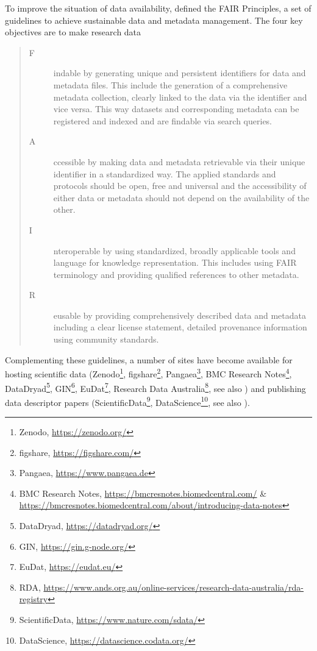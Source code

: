 To improve the situation of data availability, \citet{Wilkinson_2016} defined the FAIR Principles, a set of guidelines to achieve sustainable data and metadata management. The four key objectives are to make research data
\begin{quote}
\begin{description}
 \item[F]indable by generating unique and persistent identifiers for data and metadata files. This include the generation of a comprehensive metadata collection, clearly linked to the data via the identifier and vice versa. This way datasets and corresponding metadata can be registered and indexed and are findable via search queries.
 \item[A]ccessible by making data and metadata retrievable via their unique identifier in a standardized way. The applied standards and protocols should be open, free and universal and the accessibility of either data or metadata should not depend on the availability of the other. 
 \item[I]nteroperable by using standardized, broadly applicable tools and language for knowledge representation. This includes using FAIR terminology and providing qualified references to other metadata.
 \item[R]eusable by providing comprehensively described data and metadata including a clear license statement, detailed provenance information using community standards. 
\end{description}
\end{quote}
 Complementing these guidelines, a number of sites have become available for hosting scientific data (Zenodo\footnote{Zenodo, \url{https://zenodo.org/}}, figshare\footnote{figshare, \url{https://figshare.com/}}, Pangaea\footnote{Pangaea, \url{https://www.pangaea.de}}, BMC Research Notes\footnote{BMC Research Notes, \url{https://bmcresnotes.biomedcentral.com/} \& \url{https://bmcresnotes.biomedcentral.com/about/introducing-data-notes}}, DataDryad\footnote{DataDryad, \url{https://datadryad.org/}}, GIN\footnote{GIN, \url{https://gin.g-node.org/}}, EuDat\footnote{EuDat, \url{https://eudat.eu/}}, Research Data Australia\footnote{RDA, \url{https://www.ands.org.au/online-services/research-data-australia/rda-registry}}, see also \citet{Assante_2016}) and publishing data descriptor papers (ScientificData\footnote{ScientificData, \url{https://www.nature.com/sdata/}}, DataScience\footnote{DataScience, \url{https://datascience.codata.org/}}, see also \citet{Candela_2015}).

